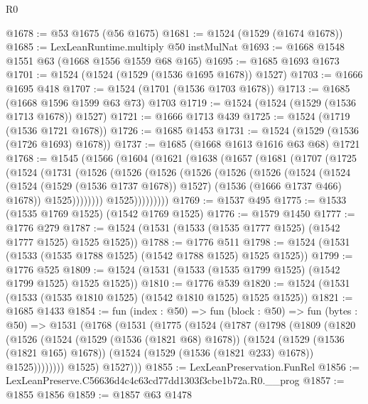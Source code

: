 \begin{lexlean}{R0}
\begin{coremodule}
@1678 := @53 @1675 (@56 @1675)
@1681 := @1524 (@1529 (@1674 @1678))
@1685 := LexLeanRuntime.multiply @50 instMulNat
@1693 := @1668 @1548 @1551 @63 (@1668 @1556 @1559 @68 @165)
@1695 := @1685 @1693 @1673
@1701 := @1524 (@1524 (@1529 (@1536 @1695 @1678)) @1527)
@1703 := @1666 @1695 @418
@1707 := @1524 (@1701 (@1536 @1703 @1678))
@1713 := @1685 (@1668 @1596 @1599 @63 @73) @1703
@1719 := @1524 (@1524 (@1529 (@1536 @1713 @1678)) @1527)
@1721 := @1666 @1713 @439
@1725 := @1524 (@1719 (@1536 @1721 @1678))
@1726 := @1685 @1453
@1731 := @1524 (@1529 (@1536 (@1726 @1693) @1678))
@1737 := @1685 (@1668 @1613 @1616 @63 @68) @1721
@1768 := @1545
    (@1566
      (@1604
        (@1621
          (@1638
            (@1657
              (@1681
                (@1707
                  (@1725
                    (@1524
                      (@1731
                        (@1526
                          (@1526
                            (@1526
                              (@1526
                                (@1526
                                  (@1526
                                    (@1524
                                      (@1524
                                        (@1524 (@1529 (@1536 @1737 @1678)) @1527)
                                        (@1536 (@1666 @1737 @466) @1678))
                                      @1525))))))))
                      @1525)))))))))
@1769 := @1537 @495
@1775 := @1533 (@1535 @1769 @1525) (@1542 @1769 @1525)
@1776 := @1579 @1450
@1777 := @1776 @279
@1787 := @1524 (@1531 (@1533 (@1535 @1777 @1525) (@1542 @1777 @1525) @1525 @1525))
@1788 := @1776 @511
@1798 := @1524 (@1531 (@1533 (@1535 @1788 @1525) (@1542 @1788 @1525) @1525 @1525))
@1799 := @1776 @525
@1809 := @1524 (@1531 (@1533 (@1535 @1799 @1525) (@1542 @1799 @1525) @1525 @1525))
@1810 := @1776 @539
@1820 := @1524 (@1531 (@1533 (@1535 @1810 @1525) (@1542 @1810 @1525) @1525 @1525))
@1821 := @1685 @1433
@1854 := fun (index : @50) =>
  fun (block : @50) =>
  fun (bytes : @50) =>
  @1531
    (@1768
      (@1531
        (@1775
          (@1524
            (@1787
              (@1798
                (@1809
                  (@1820
                    (@1526
                      (@1524
                        (@1529 (@1536 (@1821 @68) @1678))
                        (@1524
                          (@1529 (@1536 (@1821 @165) @1678))
                          (@1524 (@1529 (@1536 (@1821 @233) @1678)) @1525))))))))
            @1525)
          @1527)))
@1855 := LexLeanPreservation.FunRel
@1856 := LexLeanPreserve.C56636d4c4c63cd77dd1303f3cbe1b72a.R0.__prog
@1857 := @1855 @1856
@1859 := @1857 @63 @1478

\end{coremodule}
\end{lexlean}
